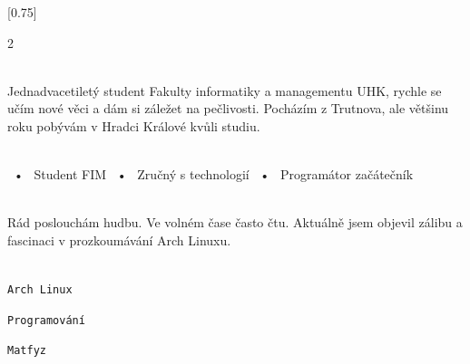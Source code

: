 \documentclass[verylight]{simplehipstercv}
\begin{document}
\setlength{\columnsep}{1.5cm}
[0.75]
\begin{paracol}{2}

\paracolbackgroundoptions



\footnotesize
{\setasidefontcolour
\flushright
{} %

\\[0.5em]

{\footnotesize
Jednadvacetiletý student Fakulty informatiky a managementu UHK, rychle se učím nové věci a dám si záležet na pečlivosti. Pocházím z Trutnova, ale většinu roku pobývám v Hradci Králové kvůli studiu.} \\
\bigskip

 \\[0.5em]

~•~ Student FIM ~•~ Zručný s technologií ~•~ Programátor začátečník

\bigskip

\\[0.5em]

Rád poslouchám hudbu.
Ve volném čase často čtu.
Aktuálně jsem objevil zálibu a fascinaci v prozkoumávání Arch Linuxu. \\
\bigskip

\\[0.5em]

\texttt{Arch Linux}

\texttt{Programování}

\texttt{Matfyz}

\vspace{4em}

 \\
 \\
\vspace{14em}

}
\end{paracol}
\end{document}
